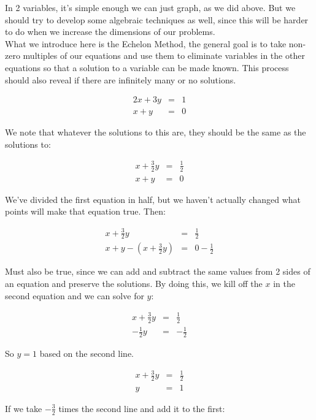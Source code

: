 In 2 variables, it's simple enough we can just graph, as we did above.  But we should try to develop some algebraic techniques as well, since this will be harder to do when we increase the dimensions of our problems.\\


What we introduce here is the Echelon Method, the general goal is to take non-zero multiples of our equations and use them to eliminate variables in the other equations so that a solution to a variable can be made known.  This process should also reveal if there are infinitely many or no solutions.\\


\begin{example}
\begin{eqnarray*}
2x+3y&=&1\\
x+y&=&0
\end{eqnarray*}

We note that whatever the solutions to this are, they should be the same as the solutions to:

\begin{eqnarray*}
x+\frac{3}{2}y&=&\frac{1}{2}\\
x+y&=&0
\end{eqnarray*}

We've divided the first equation in half, but we haven't actually changed what points will make that equation true.  Then:

\begin{eqnarray*}
x+\frac{3}{2}y&=&\frac{1}{2}\\
x+y-(x+\frac{3}{2}y)&=&0-\frac{1}{2}
\end{eqnarray*}

Must also be true, since we can add and subtract the same values from 2 sides of an equation and preserve the solutions.  By doing this, we kill off the $x$ in the second equation and we can solve for $y$:

\begin{eqnarray*}
x+\frac{3}{2}y&=&\frac{1}{2}\\
-\frac{1}{2}y&=&-\frac{1}{2}
\end{eqnarray*}

So $y=1$ based on the second line.  

\begin{eqnarray*}
x+\frac{3}{2}y&=&\frac{1}{2}\\
y&=&1
\end{eqnarray*}


If we take $-\frac{3}{2}$ times the second line and add it to the first:


\end{example}

